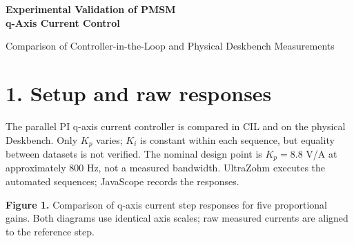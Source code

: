 \documentclass[a4paper,11pt]{article}
\newif\ifcomparison
\begin{document}
\ifcomparison
\begin{center}
{\Large\bfseries Experimental Validation of PMSM\\q-Axis Current Control}\par
\smallskip
{\large Comparison of Controller-in-the-Loop and Physical Deskbench Measurements}
\end{center}
\section*{1. Setup and raw responses}
The parallel PI q-axis current controller is compared in CIL and on the physical
Deskbench. Only $K_p$ varies; $K_i$ is constant within each sequence, but equality
between datasets is not verified. The nominal design point is $K_p=8.8$ V/A
at approximately 800 Hz, not a measured bandwidth. UltraZohm executes the
automated sequences; JavaScope records the responses.

\begin{center}
\end{center}
\smallskip
{\small\textbf{Figure 1.} Comparison of q-axis current step responses for five
proportional gains. Both diagrams use identical axis scales; raw measured currents
are aligned to the reference step.}

\newpage
\end{document}
